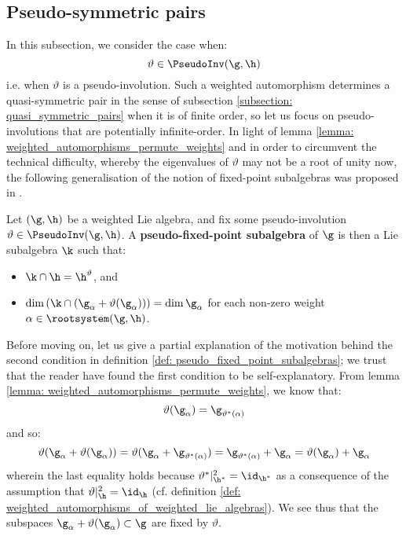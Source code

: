     \subsection{Pseudo-symmetric pairs} \label{subsection: pseudo_symmetric_pairs}
        In this subsection, we consider the case when:
            $$\vartheta \in \PseudoInv(\g, \h)$$
        i.e. when $\vartheta$ is a pseudo-involution. Such a weighted automorphism determines a quasi-symmetric pair in the sense of subsection \ref{subsection: quasi_symmetric_pairs} when it is of finite order, so let us focus on pseudo-involutions that are potentially infinite-order. In light of lemma \ref{lemma: weighted_automorphisms_permute_weights} and in order to circumvent the technical difficulty, whereby the eigenvalues of $\vartheta$ may not be a root of unity now, the following generalisation of the notion of fixed-point subalgebras was proposed in \cite[Definition 1.2]{regelskis_vlaar_kac_moody_pseudo_symmetric_pairs}. 
        \begin{definition} \label{def: pseudo_fixed_point_subalgebras}
            Let $(\g, \h)$ be a weighted Lie algebra, and fix some pseudo-involution $\vartheta \in \PseudoInv(\g, \h)$. A \textbf{pseudo-fixed-point subalgebra} of $\g$ is then a Lie subalgebra $\k$ such that:
            \begin{itemize}
                \item $\k \cap \h = \h^{\vartheta}$, and
                \item $\dim\left( \k \cap ( \g_{\alpha} + \vartheta(\g_{\alpha}) ) \right) = \dim \g_{\alpha}$ for each non-zero weight $\alpha \in \rootsystem(\g, \h)$.
            \end{itemize}
        \end{definition}
        \begin{remark}
            Before moving on, let us give a partial explanation of the motivation behind the second condition in definition \ref{def: pseudo_fixed_point_subalgebras}; we trust that the reader have found the first condition to be self-explanatory. From lemma \ref{lemma: weighted_automorphisms_permute_weights}, we know that:
                $$\vartheta(\g_{\alpha}) = \g_{\vartheta^*(\alpha)}$$
            and so:
                $$\vartheta( \g_{\alpha} + \vartheta(\g_{\alpha}) ) = \vartheta( \g_{\alpha} + \g_{\vartheta^*(\alpha)} ) = \g_{\vartheta^*(\alpha)} + \g_{\alpha} = \vartheta(\g_{\alpha}) + \g_{\alpha}$$
            wherein the last equality holds because $\vartheta^*|_{\h^*}^2 = \id_{\h^*}$ as a consequence of the assumption that $\vartheta|_{\h}^2 = \id_{\h}$ (cf. definition \ref{def: weighted_automorphisms_of_weighted_lie_algebras}). We see thus that the subspaces $\g_{\alpha} + \vartheta(\g_{\alpha}) \subset \g$ are fixed by $\vartheta$.
            
        \end{remark}
